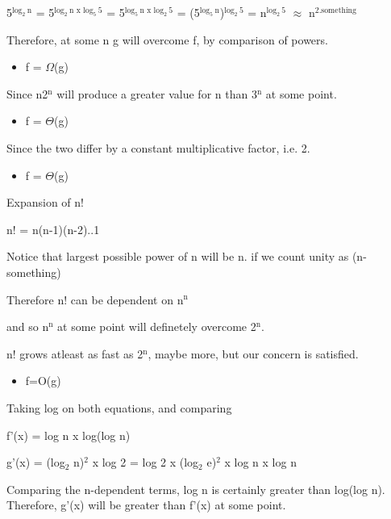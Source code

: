 \documentclass{book}
\begin{document}
\begin{EQUATION}
5\(^{\text{log}_{\text{2}} \ \text{n}}\) = 5\(^{\text{log}_{\text{2}} \ \text{n x log}_{\text{5}} \ \text{5}}\) = 5\(^{\text{log}_{\text{5}} \ \text{n x log}_{\text{2}} \ \text{5}}\) = (5\(^{\text{log}_{\text{5}} \ \text{n}}\))\(^{\text{log}_{\text{2}} \ \text{5}}\) = n\(^{\text{log}_{\text{2}} \ \text{5}}\) \(\approx\) n\(^{\text{2.something}}\)
\end{EQUATION}

Therefore, at some n g will overcome f, by comparison of powers.
\begin{itemize}
\item f = \(\Omega\)(g)
\end{itemize}

Since n2\(^{\text{n}}\) will produce a greater value for n than 3\(^{\text{n}}\) at some point.
\begin{itemize}
\item f = \(\Theta\)(g)
\end{itemize}

Since the two differ by a constant multiplicative factor, i.e. 2.
\begin{itemize}
\item f = \(\Theta\)(g)
\end{itemize}

\begin{EQUATION}
Expansion of n!

n! = n(n-1)(n-2)..1

Notice that largest possible power of n will be n. if we count unity as (n-something)

Therefore n! can be dependent on n\(^{\text{n}}\)

and so n\(^{\text{n}}\) at some point will definetely overcome 2\(^{\text{n}}\).

n! grows atleast as fast as 2\(^{\text{n}}\), maybe more, but our concern is satisfied.
\end{EQUATION}
\begin{itemize}
\item f=O(g)
\end{itemize}
\begin{EQUATION}
Taking log on both equations, and comparing

f'(x) = log n x log(log n)

g'(x) = (log\(_{\text{2}}\) n)\(^{\text{2}}\) x log 2 = log 2 x (log\(_{\text{2}}\) e)\(^{\text{2}}\) x log n x log n

Comparing the n-dependent terms, log n is certainly greater than log(log n). Therefore, g'(x) will be greater than f'(x) at some point.
\end{EQUATION}
\end{document}
